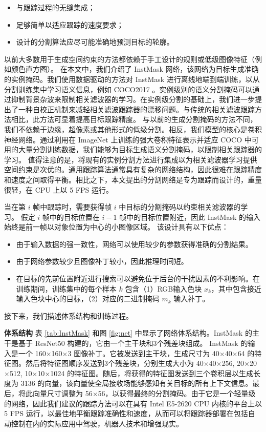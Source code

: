 \begin{itemize}
\item 与跟踪过程的无缝集成；
\item 足够简单以适应跟踪的速度要求；
\item 设计的分割算法应尽可能准确地预测目标的轮廓。
\end{itemize}

以前大多数用于生成空间约束的方法都依赖于手工设计的规则或低级图像特征（例如颜色直方图）。
在本文中，我们介绍了 InstMask 网络，该网络为目标生成准确的实例掩码。我们使用数据驱动的方法对 InstMask 进行离线地端到端训练，以从分割训练集中学习语义信息，例如 COCO2017 \cite{COCO}。实例级别的语义分割掩码可以通过抑制背景杂波来限制相关滤波器的学习。在实例级分割的基础上，我们进一步提出了一种自校正机制来减轻相关滤波跟踪器的漂移问题。与传统的相关滤波跟踪方法相比，此方法可显着提高目标跟踪精度。
与以前的生成分割掩码的方法不同，我们不依赖于边缘，超像素或其他形式的低级分割。相反，我们模型的核心是卷积神经网络。通过利用在 ImageNet \cite{ImageNet} 上训练的强大卷积特征表示并适应 COCO 中可用的大量分割训练数据，我们能够为目标生成语义分割掩码，以限制相关跟踪器的学习。
值得注意的是，将现有的实例分割方法进行集成以为相关滤波器学习提供空间约束是次优的。通用跟踪算法通常具有复杂的网络结构，因此很难在跟踪精度和速度之间取得平衡。相比之下，本文提出的分割网络是专为跟踪而设计的，重量很轻，在 CPU 上以 5 FPS 运行。

当在第 $i$ 帧中跟踪时，需要获得帧 $i$ 中目标的分割掩码以约束相关滤波器的学习。
假定 $i$ 帧中的目标位置在 $i-1$ 帧中的目标位置附近，因此 InstMask 的输入始终是前一帧以对象位置为中心的小图像区域。
该设计具有以下优点：

\begin{itemize}
\item 由于输入数据的强一致性，网络可以使用较少的参数获得准确的分割结果。
\item 由于网络参数较少且图像补丁较小，因此推理时间短。
\item 在目标的先前位置附近进行搜索可以避免位于后台的干扰因素的不利影响。在训练期间，训练集中的每个样本 $k$ 包含（1）RGB输入色块 $x_k$，其中包含接近输入色块中心的目标，（2）对应的二进制掩码 $m_{k}$ 输入补丁。
\end{itemize}

接下来，我们描述体系结构和训练过程。

\textbf{体系结构} 表 \ref{tab:InstMask} 和图 \ref{fig:net} 中显示了网络体系结构。InstMask 的主干是基于 ResNet50 \cite{He2016DeepRL} 构建的，它由一个主干块和3个残差块组成。
InstMask 的输入是一个 160$\times$160$\times$3 图像补丁。它被发送到主干块，生成尺寸为 40$\times$40$\times$64 的特征图。然后将特征图顺序发送到3个残差块，分别生成大小为 40$\times$40$\times$256, 20$\times$20$\times$512, 10$\times$10$\times$1024 的特征图。随后，将获得的特征图发送到三个卷积层以生成长度为 3136 的向量，该向量使全局接收场能够感知有关目标的所有上下文信息。最后，将此向量尺寸调整为 56$\times$56，以获得最终的分割掩码。由于它是一个轻量级的网络，因此我们建议的跟踪方法可以在具有 Intel E5-2620 CPU 内核的平台上以 5 FPS 运行，以最佳地平衡跟踪准确性和速度，从而可以将跟踪器部署在包括自动控制在内的实际应用中驾驶，机器人技术和增强现实。

